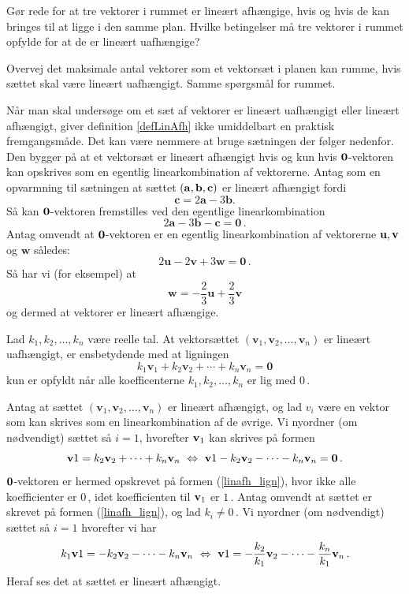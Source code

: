 \begin{exercise}
Gør rede for at tre vektorer i rummet er lineært afhængige, hvis og hvis de kan bringes til at ligge i den samme plan. Hvilke betingelser må tre vektorer i rummet opfylde for at de er lineært uafhængige?
\end{exercise}
\begin{exercise}
Overvej det maksimale antal vektorer som et vektorsæt i planen kan rumme, hvis sættet skal være lineært uafhængigt. Samme spørgsmål for rummet. 
\end{exercise}

Når man skal undersøge om et sæt af vektorer er lineært uafhængigt eller lineært afhængigt, giver definition \ref{defLinAfh} ikke umiddelbart en praktisk fremgangsmåde. Det kan være nemmere at bruge sætningen der følger nedenfor. Den bygger på at et vektorsæt er lineært afhængigt hvis og kun hvis $\bm{0}$-vektoren kan opskrives som en egentlig linearkombination af vektorerne. Antag som en opvarmning til sætningen at sættet $(\mathbf{a},\mathbf{b},\mathbf{c})$ er lineært afhængigt fordi
$$\mathbf c=2\mathbf a-3\mathbf b.$$
Så kan $\bm{0}$-vektoren fremstilles ved den egentlige linearkombination
$$2\mathbf a-3\mathbf b-\mathbf c=\mathbf 0\,.$$
Antag omvendt at $\bm{0}$-vektoren er en egentlig linearkombination af vektorerne $\mathbf u, \mathbf{v}$ og $\mathbf w$ således:
$$2\mathbf u-2\mathbf v +3\mathbf w=\mathbf 0\,.$$
Så har vi (for eksempel) at
$$\mathbf w=-\frac 2 3\mathbf u + \frac 2 3\mathbf v$$
og dermed at vektorer er lineært afhængige. 

\begin{theorem}\label{linafh}
Lad $k_1, k_2,\ldots,k_n$ være reelle tal. At vektorsættet $(\mathbf v_1,\mathbf v_2,\ldots,\mathbf v_n)$ er lineært uafhængigt, er ensbetydende med at ligningen
\begin{equation}\label{linafh_lign}
k_1{\mathbf v}_1+k_2{\mathbf v}_2+\cdots+k_n{\mathbf v}_n= \mathbf 0
\end{equation}
kun er opfyldt når alle koefficenterne $k_1, k_2,\ldots, k_n$ er lig med $0\,$.
\end{theorem}

\begin{bevis}
Antag at sættet $(\mathbf v_1,\mathbf v_2,\ldots,\mathbf v_n)$ er lineært afhængigt, og lad $v_i$ være en vektor som kan skrives som en linearkombination af de øvrige. Vi nyordner (om nødvendigt) sættet så $i=1$, hvorefter $\mathbf{v}_1$ kan skrives på formen 
\begin{equation}
\mathbf{v}1=k_2\mathbf{v}_2+\cdots+k_n\mathbf{v}_n
\,\,\Leftrightarrow\,\,
\mathbf{v}1-k_2\mathbf{v}_2-\cdots-k_n\mathbf{v}_n=\bm{0}\,.
\end{equation}
$\bm{0}$-vektoren er hermed opskrevet på formen (\ref{linafh_lign}), hvor ikke alle koefficienter er $0\,$, idet koefficienten til $\mathbf{v}_1$ er $1\,$.\bs
Antag omvendt at sættet er skrevet på formen (\ref{linafh_lign}), og lad $k_i\neq 0\,.$ Vi nyordner (om nødvendigt) sættet så $i=1$ hvorefter vi har
\begin{equation}
k_1\mathbf{v}1=-k_2\mathbf{v}_2-\cdots-k_n\mathbf{v}_n
\,\,\Leftrightarrow\,\,
\mathbf{v}1=-\frac{k_2}{k_1}\mathbf{v}_2-\cdots-\frac{k_n}{k_1}\mathbf{v}_n\,.
\end{equation}
Heraf ses det at sættet er lineært afhængigt.
\end{bevis}

